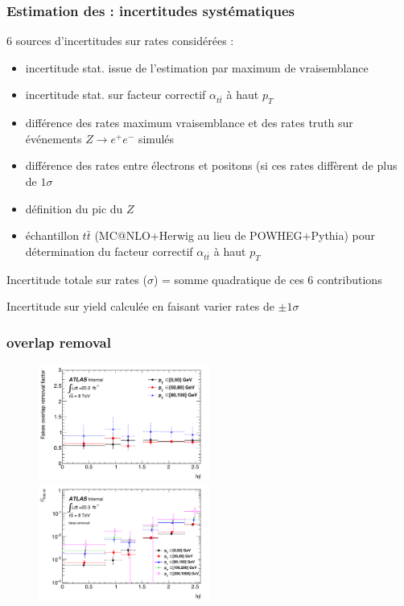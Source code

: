 \begin{frame}
\frametitle{Estimation des  : incertitudes systématiques}

\begin{maliste}
\item 6 sources d'incertitudes sur rates considérées :
\begin{itemize}
\item incertitude stat. issue de l'estimation par maximum de vraisemblance
\item incertitude stat. sur facteur correctif $\alpha_{t\bar{t}}$ à haut $p_T$  
\item différence des rates maximum vraisemblance et des rates truth sur événements $Z\rightarrow e^+e^-$ simulés
\item différence des rates entre électrons et positons (si ces rates diffèrent de plus de $1\sigma$
\item définition du pic du $Z$
\item échantillon $t\bar{t}$ (MC@NLO+Herwig au lieu de POWHEG+Pythia) pour détermination du facteur correctif $\alpha_{t\bar{t}}$ à haut $p_T$
\end{itemize}
\item Incertitude totale sur rates ($\sigma$) = somme quadratique de ces 6 contributions
\item Incertitude sur yield calculée en faisant varier rates de $\pm 1\sigma$
\end{maliste}

\end{frame}


\begin{frame}
\frametitle{ overlap removal}

\begin{figure}[p]
  \begin{center}
\includegraphics[width=0.5\textwidth]{Figures/QMisId/Overlap.pdf}
\includegraphics[width=0.5\textwidth]{Figures/QMisId/Rates2DwithoutFakes.pdf}
  \end{center}
\end{figure}
\end{frame}

